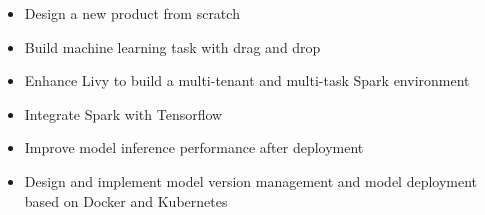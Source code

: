 \documentclass[11pt,a4paper,sans]{moderncv}   %
\begin{document}
\begin{CJK*}{UTF8}{gbsn}
{\begin{itemize}
  \begin{itemize}%
  \item Design a new product from scratch
  \item Build machine learning task with drag and drop
  \item Enhance Livy to build a multi-tenant and multi-task Spark environment
  \item Integrate Spark with Tensorflow
  \item Improve model inference performance after deployment
  \item Design and implement model version management and model deployment based on Docker and Kubernetes
  \end{itemize}
\end{itemize}}


%


\end{CJK*}
\end{document}
